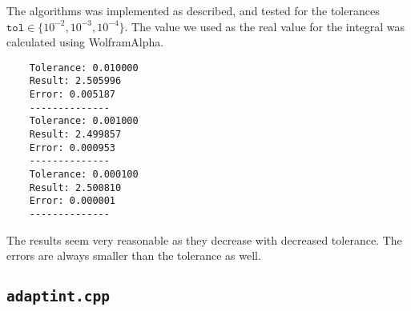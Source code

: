 \documentclass[12pt]{article}
\begin{document}
The algorithms was implemented as described, and tested for the tolerances $\texttt{tol} \in \{10^{-2}, 10^{-3}, 10^{-4}\}$. The value we used as the real value for the integral was calculated using WolframAlpha.
\begin{verbatim}
    Tolerance: 0.010000
    Result: 2.505996
    Error: 0.005187
    --------------
    Tolerance: 0.001000
    Result: 2.499857
    Error: 0.000953
    --------------
    Tolerance: 0.000100
    Result: 2.500810
    Error: 0.000001
    --------------
\end{verbatim}

The results seem very reasonable as they decrease with decreased tolerance. The errors are always smaller than the tolerance as well.

\subsection*{\texttt{adaptint.cpp}}

\end{document}
